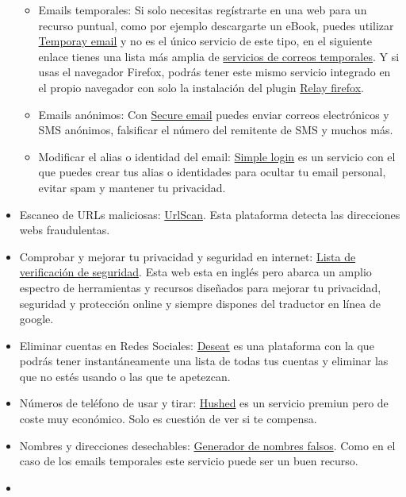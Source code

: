 \documentclass[
  spanish,
  a4paper,
  openany]{book}
\begin{document}
\begin{itemize}
  \begin{itemize}
  \item
    Emails temporales: Si solo necesitas regístrarte en una web para un recurso puntual, como por ejemplo descargarte un eBook, puedes utilizar \href{https://temp-mail.org/es/}{Temporay email} y no es el único servicio de este tipo, en el siguiente enlace tienes una lista más amplia de \href{https://www.genbeta.com/correo/7-servicios-de-email-temporales-para-evitar-spam-y-otros-problemas}{servicios de correos temporales}. Y si usas el navegador Firefox, podrás tener este mismo servicio integrado en el propio navegador con solo la instalación del plugin \href{https://relay.firefox.com}{Relay firefox}.
  \item
    Emails anónimos: Con \href{https://www.secure-email.org/index.php}{Secure email} puedes enviar correos electrónicos y SMS anónimos, falsificar el número del remitente de SMS y muchos más.
  \item
    Modificar el alias o identidad del email: \href{https://simplelogin.io/}{Simple login} es un servicio con el que puedes crear tus alias o identidades para ocultar tu email personal, evitar spam y mantener tu privacidad.
  \end{itemize}
\item
  Escaneo de URLs maliciosas: \href{https://urlscan.io/}{UrlScan}. Esta plataforma detecta las direcciones webs fraudulentas.
\item
  Comprobar y mejorar tu privacidad y seguridad en internet: \href{https://securitycheckli.st/}{Lista de verificación de seguridad}. Esta web esta en inglés pero abarca un amplio espectro de herramientas y recursos diseñados para mejorar tu privacidad, seguridad y protección online y siempre dispones del traductor en línea de google.
\item
  Eliminar cuentas en Redes Sociales: \href{https://www.deseat.me/}{Deseat} es una plataforma con la que podrás tener instantáneamente una lista de todas tus cuentas y eliminar las que no estés usando o las que te apetezcan.
\item
  Números de teléfono de usar y tirar: \href{https://hushed.com}{Hushed} es un servicio premiun pero de coste muy económico. Solo es cuestión de ver si te compensa.
\item
  Nombres y direcciones desechables: \href{https://www.fakenamegenerator.com}{Generador de nombres falsos}. Como en el caso de los emails temporales este servicio puede ser un buen recurso.
\item

\end{itemize}
\end{document}
